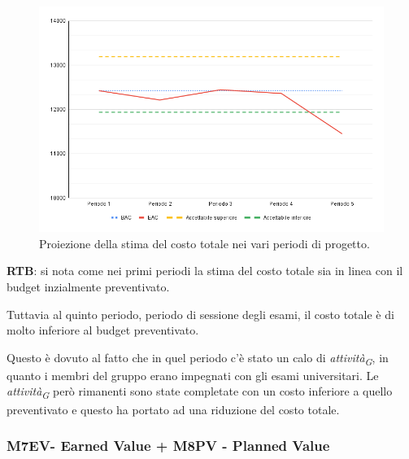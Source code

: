 \begin{figure}[H]
    \centering
    \includegraphics[width=1\textwidth]{../Images/PianoDiQualifica/M2EAC.png}
    \caption{Proiezione della stima del costo totale nei vari periodi di progetto.}
    \label{fig:2}
\end{figure}

\vspace{0.2cm}

\textbf{RTB}: si nota come nei primi periodi la stima del costo totale sia in linea con il budget inzialmente preventivato.

Tuttavia al quinto periodo, periodo di sessione degli esami, il costo totale è di molto inferiore al budget preventivato.

\vspace{0.2cm}

Questo è dovuto al fatto che in quel periodo c'è stato un calo di \textit{attività}\textsubscript{\textit{G}}, in quanto i membri del gruppo erano impegnati con gli esami universitari. Le \textit{attività}\textsubscript{\textit{G}} però rimanenti sono state completate con un costo inferiore a quello preventivato e questo ha portato ad una riduzione del costo totale.\\

\subsubsection{M7EV- Earned Value + M8PV - Planned Value} 

\vspace{0.3cm}

